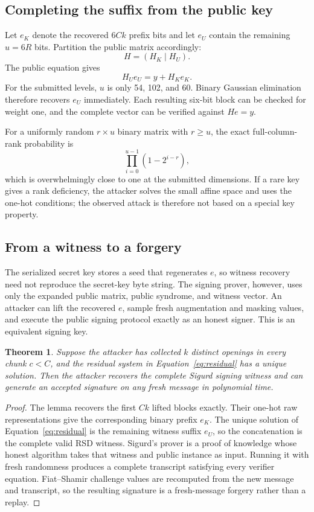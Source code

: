 \documentclass[11pt,a4paper]{article}
\newtheorem{theorem}{Theorem}
\begin{document}
\subsection{Completing the suffix from the public key}

Let $e_K$ denote the recovered $6Ck$ prefix bits and let $e_U$ contain the
remaining $u=6R$ bits.  Partition the public matrix accordingly:
\[
                       H=(H_K\mid H_U).
\]
The public equation gives
\begin{equation}
                       H_Ue_U=y+H_Ke_K.
\label{eq:residual}
\end{equation}
For the submitted levels, $u$ is only 54, 102, and 60.  Binary Gaussian
elimination therefore recovers $e_U$ immediately.  Each resulting six-bit
block can be checked for weight one, and the complete vector can be verified
against $He=y$.

For a uniformly random $r\times u$ binary matrix with $r\ge u$, the exact
full-column-rank probability is
\[
                    \prod_{i=0}^{u-1}(1-2^{i-r}),
\]
which is overwhelmingly close to one at the submitted dimensions.  If a rare
key gives a rank deficiency, the attacker solves the small affine space and
uses the one-hot conditions; the observed attack is therefore not based on a
special key property.

\subsection{From a witness to a forgery}

The serialized secret key stores a seed that regenerates $e$, so witness
recovery need not reproduce the secret-key byte string.  The signing prover,
however, uses only the expanded public matrix, public syndrome, and witness
vector.  An attacker can lift the recovered $e$, sample fresh augmentation and
masking values, and execute the public signing protocol exactly as an honest
signer.  This is an equivalent signing key.

\begin{theorem}
Suppose the attacker has collected $k$ distinct openings in every chunk
$c<C$, and the residual system in Equation~\eqref{eq:residual} has a unique
solution.  Then the attacker recovers the complete Sigurd signing witness and
can generate an accepted signature on any fresh message in polynomial time.
\end{theorem}

\begin{proof}
The lemma recovers the first $Ck$ lifted blocks exactly.  Their one-hot raw
representations give the corresponding binary prefix $e_K$.  The unique
solution of Equation~\eqref{eq:residual} is the remaining witness suffix
$e_U$, so the concatenation is the complete valid RSD witness.  Sigurd's prover
is a proof of knowledge whose honest algorithm takes that witness and public
instance as input.  Running it with fresh randomness produces a complete
transcript satisfying every verifier equation.  Fiat--Shamir challenge values
are recomputed from the new message and transcript, so the resulting signature
is a fresh-message forgery rather than a replay.
\end{proof}
\end{document}
